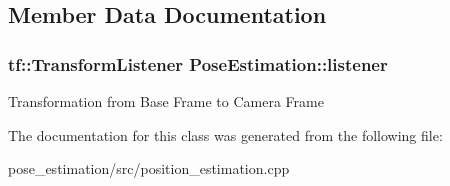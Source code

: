 \subsection{Member Data Documentation}
\subsubsection[{\texorpdfstring{listener}{listener}}]{\setlength{\rightskip}{0pt plus 5cm}tf\+::\+Transform\+Listener Pose\+Estimation\+::listener}\hypertarget{classPoseEstimation_ae08bd154a6ef0eefd852c6af56e51743}{}\label{classPoseEstimation_ae08bd154a6ef0eefd852c6af56e51743}
Transformation from Base Frame to Camera Frame 

The documentation for this class was generated from the following file\+:\begin{DoxyCompactItemize}
\item 
pose\+\_\+estimation/src/position\+\_\+estimation.\+cpp\end{DoxyCompactItemize}
